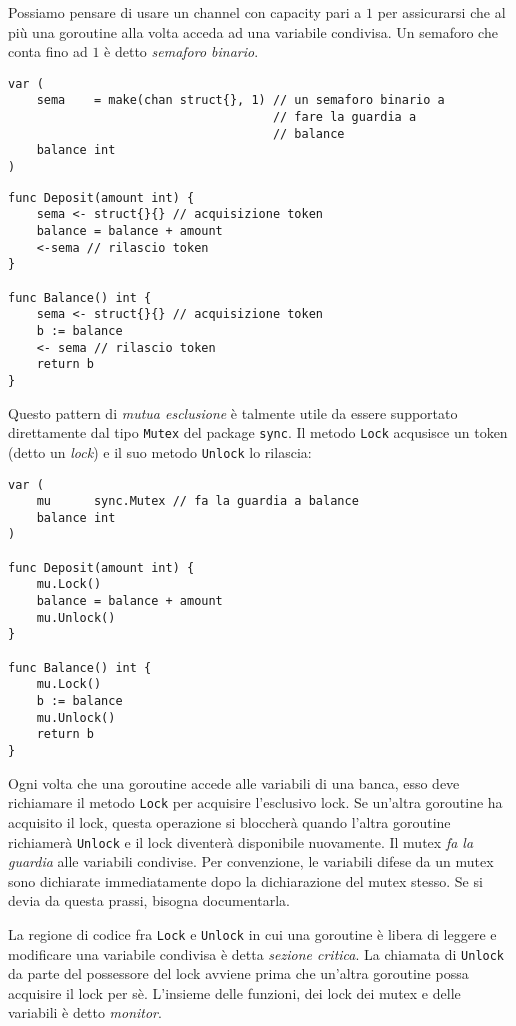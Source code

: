 %
Possiamo pensare di usare un channel con capacity pari a $1$ per assicurarsi che al più una goroutine alla volta acceda ad una variabile condivisa.
Un semaforo che conta fino ad $1$ è detto \textit{semaforo binario}.
\begin{lstlisting}[frame=single, label={lst:lstlisting9-2.1}]
var (
    sema    = make(chan struct{}, 1) // un semaforo binario a
                                     // fare la guardia a
                                     // balance
    balance int
)
\end{lstlisting}
\begin{lstlisting}[frame=single, label={lst:lstlisting9-2.2}]
func Deposit(amount int) {
    sema <- struct{}{} // acquisizione token
    balance = balance + amount
    <-sema // rilascio token
}

func Balance() int {
    sema <- struct{}{} // acquisizione token
    b := balance
    <- sema // rilascio token
    return b
}
\end{lstlisting}
Questo pattern di \textit{mutua esclusione} è talmente utile da essere supportato direttamente dal tipo \verb|Mutex| del package \verb|sync|.
Il metodo \verb|Lock| acqusisce un token (detto un \textit{lock}) e il suo metodo \verb|Unlock| lo rilascia:
\begin{lstlisting}[frame=single, label={lst:lstlisting9-2.3}]
var (
    mu      sync.Mutex // fa la guardia a balance
    balance int
)

func Deposit(amount int) {
    mu.Lock()
    balance = balance + amount
    mu.Unlock()
}

func Balance() int {
    mu.Lock()
    b := balance
    mu.Unlock()
    return b
}
\end{lstlisting}
Ogni volta che una goroutine accede alle variabili di una banca, esso deve richiamare il metodo \verb|Lock| per acquisire l'esclusivo lock.
Se un'altra goroutine ha acquisito il lock, questa operazione si bloccherà quando l'altra goroutine richiamerà \verb|Unlock| e il lock diventerà disponibile nuovamente.
Il mutex \textit{fa la guardia} alle variabili condivise.
Per convenzione, le variabili difese da un mutex sono dichiarate immediatamente dopo la dichiarazione del mutex stesso.
Se si devia da questa prassi, bisogna documentarla.

La regione di codice fra \verb|Lock| e \verb|Unlock| in cui una goroutine è libera di leggere e modificare una variabile condivisa è detta \textit{sezione critica}.
La chiamata di \verb|Unlock| da parte del possessore del lock avviene prima che un'altra goroutine possa acquisire il lock per sè.
L'insieme delle funzioni, dei lock dei mutex e delle variabili è detto \textit{monitor}.

